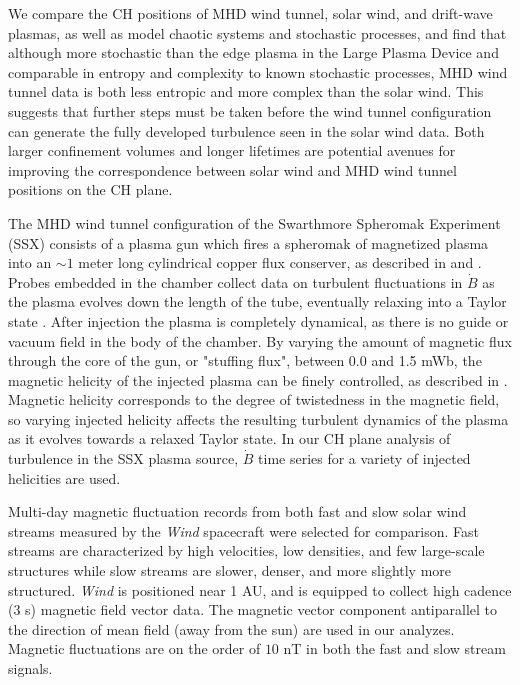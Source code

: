 \documentclass[aps,pre,twocolumn,secnumarabic,nobalancelastpage,amsmath,amssymb,
nofootinbib]{revtex4-1}
\begin{document}
We compare the CH positions of MHD wind tunnel, solar wind, and drift-wave plasmas, as well as model chaotic systems and stochastic processes, and find that although more stochastic than the edge plasma in the Large Plasma Device and comparable in entropy and complexity to known stochastic processes, MHD wind tunnel data is both less entropic and more complex than the solar wind. This suggests that further steps must be taken before the wind tunnel configuration can generate the fully developed turbulence seen in the solar wind data. Both larger confinement volumes and longer lifetimes are potential avenues for improving the correspondence between  solar wind and MHD wind tunnel positions on the CH plane.

The MHD wind tunnel configuration of the Swarthmore Spheromak Experiment (SSX) consists of a plasma gun which fires a spheromak of magnetized plasma into an $\sim1$ meter long cylindrical copper flux conserver, as described in \cite{zhang2011} and \cite{schaffner2014}. Probes embedded in the chamber collect data on turbulent fluctuations in $\dot{B}$ as the plasma evolves down the length of the tube, eventually relaxing into a Taylor state \cite{gray2013}. After injection the plasma is completely dynamical, as there is no guide or vacuum field in the body of the chamber. By varying the amount of magnetic flux through the core of the gun, or "stuffing flux", between 0.0 and 1.5 mWb, the magnetic helicity of the injected plasma can be finely controlled, as described in \cite{schaffner2014}. Magnetic helicity corresponds to the degree of twistedness in the magnetic field, so varying injected helicity affects the resulting turbulent dynamics of the plasma as it evolves towards a relaxed Taylor state. In our CH plane analysis of turbulence in the SSX plasma source, $\dot{B}$ time series for a variety of injected helicities are used. 

 Multi-day magnetic fluctuation records from both fast and slow solar wind streams measured by the \textit{Wind} spacecraft were selected for comparison. Fast streams are characterized by high velocities, low densities, and  few large-scale structures while slow streams are slower, denser, and more slightly more structured. \textit{Wind} is positioned near 1 AU, and is equipped to collect high cadence (3 s) magnetic field vector data.   The magnetic vector component antiparallel to the direction of mean field (away from the sun) are used in our analyzes. Magnetic fluctuations are on the order of $10$ nT in both the fast and slow stream signals. 
\end{document}
